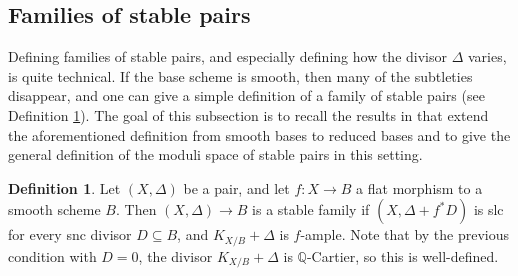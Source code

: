 \documentclass[11pt]{amsart}
\newcommand{\margg}[1]{\normalsize{{\color{red}\footnote{{\color{red}#1}}}{\marginpar[{\color{red}\hfill\tiny\thefootnote$\rightarrow$}]{{\color{red}$\leftarrow$\tiny\thefootnote}}}}}
\newcommand{\Dori}[1]{\margg{(Dori) #1}}
\theoremstyle{definition}
\newtheorem{definition}[theorem]{Definition}
\theoremstyle{remark}
\newcommand{\bQ}{{\mathbb Q}}
\begin{document}
	\subsection{Families of stable pairs}
	Defining families of stable pairs, and especially defining how the divisor $\Delta$ varies, is quite technical. If the base scheme is smooth, then many of the subtleties disappear, and one can give a simple definition of a family of stable pairs (see Definition \ref{def:family:st:pair:over:smooth:base}). The goal of this subsection is to recall the results in \cite[Chapter 4]{kollarmodulibook} that extend the aforementioned definition from smooth bases to reduced bases and to give the general definition of the moduli space of stable pairs in this setting.
	
	
	
	\begin{definition}\label{def:family:st:pair:over:smooth:base}\cite[Corollary 4.55]{kollarmodulibook}
		Let $(X,\Delta)$ be a pair, and let $f:X\to B $ a flat morphism to a smooth scheme $B$. Then $(X,\Delta)\to B$ is a stable family if $(X,\Delta + f^*D)$ is slc for every snc divisor $D\subseteq B$, and $K_{X/B}+\Delta$ is $f$-ample. Note that by the previous condition with $D=0$, the divisor $K_{X/B} + \Delta$ is $\bQ$-Cartier, so this is well-defined.
	\end{definition}
	
\end{document}
